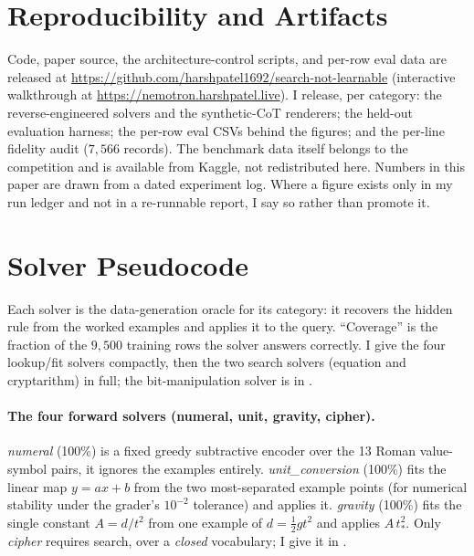 \documentclass[11pt]{article}
\begin{document}
\section*{Reproducibility and Artifacts}
Code, paper source, the architecture-control scripts, and per-row eval data are released at
\url{https://github.com/harshpatel1692/search-not-learnable} (interactive walkthrough at
\url{https://nemotron.harshpatel.live}). I release, per category: the reverse-engineered solvers
and the synthetic-CoT renderers; the held-out evaluation harness; the per-row eval CSVs behind
the figures; and the per-line fidelity audit ($7{,}566$ records). The benchmark data itself
belongs to the competition and is available from Kaggle, not redistributed here. Numbers in this
paper are drawn from a dated experiment log. Where a figure exists only in my run ledger and not in a
re-runnable report, I say so rather than promote it.

\appendix
\section{Solver Pseudocode}
\label{app:solvers}

Each solver is the data-generation oracle for its category: it recovers the hidden rule
from the worked examples and applies it to the query. ``Coverage'' is the fraction of the
$9{,}500$ training rows the solver answers correctly. I give the four lookup/fit solvers
compactly, then the two search solvers (equation and cryptarithm) in full; the
bit-manipulation solver is in .

\paragraph{The four forward solvers (numeral, unit, gravity, cipher).}
\emph{numeral} (100\%) is a fixed greedy subtractive encoder over the 13 Roman value-symbol
pairs, it ignores the examples entirely. \emph{unit\_conversion} (100\%) fits the linear
map $y=ax+b$ from the two most-separated example points (for numerical stability under the
grader's $10^{-2}$ tolerance) and applies it. \emph{gravity} (100\%) fits the single
constant $A=d/t^2$ from one example of $d=\tfrac12 g t^2$ and applies $A\,t_*^2$. Only
\emph{cipher} requires search, over a \emph{closed} vocabulary; I give it in
.
\end{document}
